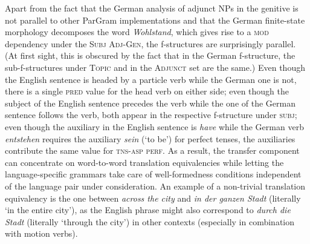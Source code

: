 \documentclass[output=paper,hidelinks]{langscibook}
\begin{document}
\noindent Apart from the fact that the German analysis of adjunct NPs in the genitive is not parallel to other ParGram implementations and that the German finite-state morphology decomposes the word {\em Wohlstand}, which gives rise to a \textsc{mod} dependency under the \textsc{Subj Adj-Gen}, the f-structures are surprisingly parallel. (At first sight, this is obscured by the fact that in the German f-structure, the sub-f-structures under \textsc{Topic} and in the \textsc{Adjunct} set are the same.) Even though the English sentence is headed by a particle verb while the German one is not, there is a single \textsc{pred} value for the head verb on either side; even though the subject of the English sentence precedes the verb while the one of the German sentence follows the verb, both appear in the respective f-structure under \textsc{subj};  even though the auxiliary in the English sentence is  {\em have} while the German verb {\em entstehen} requires the auxiliary {\em sein} (`to be') for perfect tenses, the auxiliaries contribute the same value for \textsc{tns-asp perf}. As a result, the transfer component can concentrate on  word-to-word translation equivalencies while letting the language-specific grammars take care of well-formedness conditions independent of the language pair under consideration. An example of a non-trivial translation equivalency is the one between {\em across the city} and {\em in der ganzen Stadt} (literally `in the entire city'), as the English phrase might also correspond to {\em durch die Stadt} (literally `through the city') in other contexts (especially in combination with motion verbs).
\end{document}
